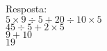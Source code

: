 \documentclass[a4paper,14pt]{article}
\begin{document}
\begin{multicols}{2}
\begin{enumerate}
\begin{enumerate}[a)]
				Resposta: \\
				
				$5 \times 9 \div 5 + 20 \div 10 \times 5$ \\
				$45 \div 5 + 2 \times 5$\\
				$9 + 10$\\
				$19$\\
				
			\end{enumerate}
        \end{enumerate}
    $~$ \\ $~$ \\ $~$ \\ $~$ \\ $~$ \\ $~$
    \end{multicols}
\end{document}
